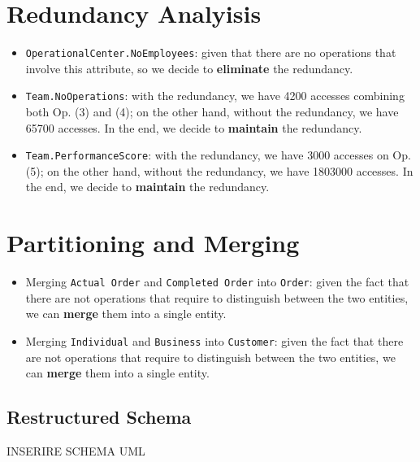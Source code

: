 \section{Redundancy Analyisis}
\begin{itemize}[label=-]
\item \texttt{OperationalCenter.NoEmployees}: given that there are no operations that involve this attribute, so we decide to \textbf{eliminate} the redundancy.
\item \texttt{Team.NoOperations}: with the redundancy, we have 4200 accesses combining both Op. (3) and (4); on the other hand, without the redundancy, we have 65700 accesses. In the end, we decide to \textbf{maintain} the redundancy.
\item \texttt{Team.PerformanceScore}: with the redundancy, we have 3000 accesses on Op. (5); on the other hand, without the redundancy, we have 1803000 accesses. In the end, we decide to \textbf{maintain} the redundancy.
\end{itemize}

\section{Partitioning and Merging}
\begin{itemize}[label=-]
    \item Merging \texttt{Actual Order} and \texttt{Completed Order} into \texttt{Order}: given the fact that there are not operations that require to distinguish between the two entities, we can \textbf{merge} them into a single entity.
    \item Merging \texttt{Individual} and \texttt{Business} into \texttt{Customer}: given the fact that there are not operations that require to distinguish between the two entities, we can \textbf{merge} them into a single entity.
\end{itemize}

\subsection{Restructured Schema}
INSERIRE SCHEMA UML
